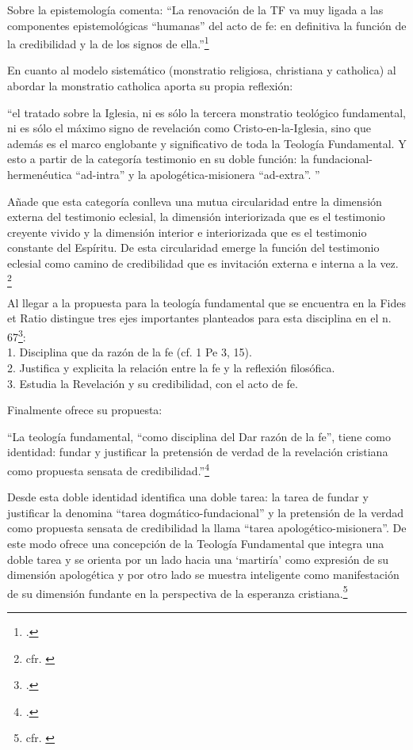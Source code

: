 \documentclass[12pt]{article}
\begin{document}
{Sobre la epistemología comenta:
``La renovación de la TF va muy ligada a las componentes epistemológicas ``humanas'' del acto de fe: en definitiva la función de la credibilidad y la de los signos de ella.''\footcite[31]{ninotTF}

En cuanto al modelo sistemático (monstratio religiosa, christiana y catholica) al abordar la monstratio catholica aporta su propia reflexión:

``el tratado sobre la Iglesia, ni es sólo la tercera monstratio teológico fundamental, ni es sólo el máximo signo de revelación como Cristo-en-la-Iglesia, sino que además es el marco englobante y significativo de toda la Teología Fundamental. Y esto a partir de la categoría testimonio en su doble función: la fundacional-hermenéutica ``ad-intra'' y la apologética-misionera ``ad-extra''. ''

Añade que esta categoría conlleva una mutua circularidad entre la dimensión externa del testimonio eclesial, la dimensión interiorizada que es el testimonio creyente vivido y la dimensión interior e interiorizada que es el testimonio constante del Espíritu. De esta circularidad emerge la función del testimonio eclesial como camino de credibilidad que es invitación externa e interna a la vez. \footnote{cfr. \cite[40]{ninotTF}}

Al llegar a la propuesta para la teología fundamental que se encuentra en la Fides et Ratio distingue tres ejes importantes planteados para esta disciplina en el n. 67\footcite[49]{ninotTF}:\\1. Disciplina que da razón de la fe (cf. 1 Pe 3, 15).\\
2. Justifica y explicita la relación entre la fe y la reflexión filosófica.\\
3. Estudia la Revelación y su credibilidad, con el acto de fe.

Finalmente ofrece su propuesta:

``La teología fundamental, ``como disciplina del Dar razón de la fe'', tiene como identidad: fundar y justificar la pretensión de verdad de la revelación cristiana como propuesta sensata de credibilidad.''\footcite[72]{ninotTF}

Desde esta doble identidad identifica una doble tarea: la tarea de fundar y justificar la denomina ``tarea dogmático-fundacional'' y la pretensión de la verdad como propuesta sensata de credibilidad la llama ``tarea apologético-misionera''. De este modo ofrece una concepción de la Teología Fundamental que integra una doble tarea y se orienta por un lado hacia una `martiría' como expresión de su dimensión apologética y por otro lado se muestra inteligente como manifestación de su dimensión fundante en la perspectiva de la esperanza cristiana.\footnote{cfr. \cite[72]{ninotTF}}

}
\end{document}
